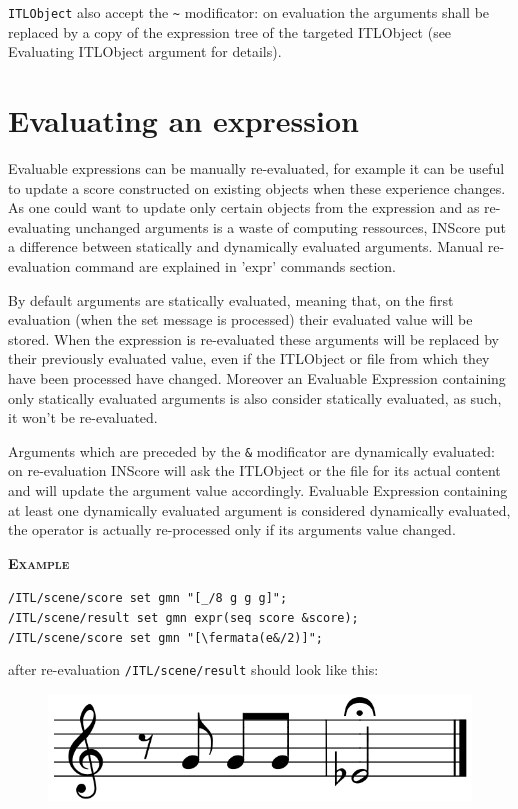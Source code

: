 \documentclass[a4paper,twoside]{report}
\newcommand{\sublevel}[1]	{\section{#1}}
\newcommand{\OSC}[1]		{\texttt{#1}}
\newcommand{\example}		{\textbf{\hspace{-1.5cm}\textbf{\textsc{Example }}}}
\newcommand{\lowTilde} 		{\textasciitilde}
\newcommand{\sample}	[1]			{\vspace{-2mm}\begin{center}\colorbox{mygrey}{
								\begin{minipage}[t]{0.9\columnwidth} 
								{\small \texttt{#1}}
								\end{minipage}}\end{center}}
\begin{document}
\OSC{ITLObject} also accept the \OSC{\lowTilde} modificator: on evaluation the arguments shall be replaced by a copy of the expression tree of the targeted ITLObject (see Evaluating ITLObject argument for details).


\pagebreak
\sublevel{Evaluating an expression}

Evaluable expressions can be manually re-evaluated, for example it can be useful to update a score constructed on existing objects when these experience changes. As one could want to update only certain objects from the expression and as re-evaluating unchanged arguments is a waste of computing ressources, INScore put a difference between statically and dynamically evaluated arguments. Manual re-evaluation command are explained in 'expr' commands section.

By default arguments are statically evaluated, meaning that, on the first evaluation (when the set message is processed) their evaluated value will be stored. When the expression is re-evaluated these arguments will be replaced by their previously evaluated value, even if the ITLObject or file from which they have been processed have changed. Moreover an Evaluable Expression containing only statically evaluated arguments is also consider statically evaluated, as such, it won't be re-evaluated.

Arguments which are preceded by the \OSC{\&} modificator are dynamically evaluated: on re-evaluation INScore will ask the ITLObject or the file for its actual content and will update the argument value accordingly. Evaluable Expression containing at least one dynamically evaluated argument is considered dynamically evaluated, the operator is actually re-processed only if its arguments value changed.

\example \\
\sample{/ITL/scene/score set gmn "[\_/8 g g g]";\\
/ITL/scene/result set gmn expr(seq score \&score);\\
/ITL/scene/score set gmn "[\textbackslash fermata(e\&/2)]";
}
after re-evaluation \OSC{/ITL/scene/result} should look like this:

\begin{figure}[h]
\centering \includegraphics[scale=0.3]{imgs/symphonie5}
\end{figure}
\end{document}
